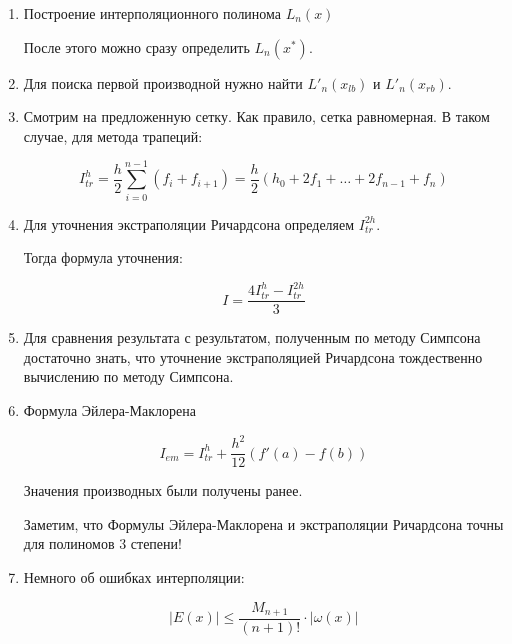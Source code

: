 \documentclass[10pt,a4paper]{article}
\begin{document}
	\begin{enumerate}
		\item Построение интерполяционного полинома $L_{n}\left(x\right)$
		
		После этого можно сразу определить $L_{n}\left(x^{*}\right)$.
		
		\item Для поиска первой производной нужно найти $L'_{n}\left(x_{lb}
		\right)$ и $L'_{n}\left(x_{rb}\right)$.
		
		\item Смотрим на предложенную сетку. Как правило, сетка равномерная. В
		таком случае, для метода трапеций:
		
		\begin{equation}
			I_{tr}^{h} = \frac{h}{2}\sum\limits_{i = 0}^{n - 1}\left(f_{i} + 
			f_{i + 
			1}\right) = \frac{h}{2}\left(h_{0} + 2f_{1} + \ldots + 2f_{n - 1} + 
			f_{n}\right)
		\end{equation}
		
		\item Для уточнения экстраполяции Ричардсона определяем $I_{tr}^{2h}$.
		
		Тогда формула уточнения:
		
		\begin{equation}
			I = \frac{4I^{h}_{tr} - I^{2h}_{tr}}{3}
		\end{equation}
		
		\item Для сравнения результата с результатом, полученным по методу 
		Симпсона достаточно знать, что уточнение экстраполяцией Ричардсона 
		тождественно вычислению по методу Симпсона.
		
		\item Формула Эйлера-Маклорена
		
		\begin{equation}
			I_{em} = I_{tr}^{h} + \frac{h^{2}}{12}\left(f'\left(a\right) - 
			f\left(b\right)\right)
		\end{equation}
		
		Значения производных были получены ранее.
		
		Заметим, что Формулы Эйлера-Маклорена и экстраполяции Ричардсона точны
		для полиномов 3 степени!
		
		\item Немного об ошибках интерполяции:
		
		\begin{equation}
			\left|E\left(x\right)\right| \leqslant \frac{M_{n + 1}}{\left(n + 1
			\right)!}\cdot\left|\omega\left(x\right)\right|
		\end{equation}
		

\end{enumerate}
\end{document}
